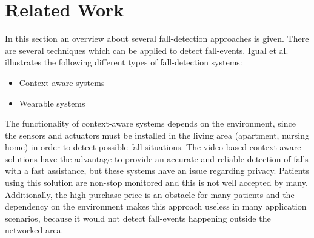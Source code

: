 \documentclass[review]{elsarticle}
\begin{document}
\section{Related Work}
\label{sec:relatedwork}
In this section an overview about several fall-detection approaches is given. There are several techniques which can be applied to detect fall-events. Igual et al. \cite{Igual2013} illustrates the following different types of fall-detection  systems:
\begin{itemize}
	\item Context-aware systems
	\item Wearable systems
\end{itemize}
The functionality of context-aware systems depends on the environment, since the sensors and actuators must be installed in the living area (apartment, nursing home) in order to detect possible fall situations. The video-based context-aware solutions have the advantage to provide an accurate and reliable detection of falls with a fast assistance, but these systems have an issue regarding privacy. Patients using this solution are non-stop monitored and this is not well accepted by many. Additionally, the high purchase price is an obstacle for many patients and the dependency on the environment makes this approach useless in many application scenarios, because it would not detect fall-events happening outside the networked area.
\end{document}

